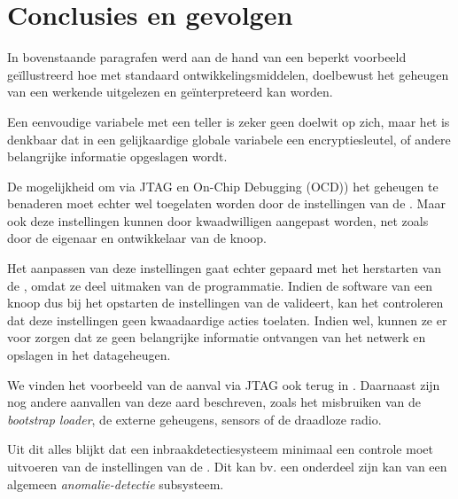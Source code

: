 \section{Conclusies en gevolgen}

In bovenstaande paragrafen werd aan de hand van een beperkt voorbeeld
ge\"illustreerd hoe met standaard ontwikkelingsmiddelen, doelbewust het
geheugen van een werkende \mcu uitgelezen en ge\"interpreteerd kan worden.

Een eenvoudige variabele met een teller is zeker geen doelwit op zich, maar het
is denkbaar dat in een gelijkaardige globale variabele een encryptiesleutel, of
andere belangrijke informatie opgeslagen wordt.

De mogelijkheid om via JTAG en On-Chip Debugging (OCD)) het geheugen te
benaderen moet echter wel toegelaten worden door de instellingen van de \mcu.
Maar ook deze instellingen kunnen door kwaadwilligen aangepast worden, net
zoals door de eigenaar en ontwikkelaar van de knoop.

Het aanpassen van deze instellingen gaat echter gepaard met het herstarten van
de \mcu, omdat ze deel uitmaken van de programmatie. Indien de software van een
knoop dus bij het opstarten de instellingen van de \mcu valideert, kan het
controleren dat deze instellingen geen kwaadaardige acties toelaten. Indien
wel, kunnen ze er voor zorgen dat ze geen belangrijke informatie ontvangen van
het netwerk en opslagen in het datageheugen.

We vinden het voorbeeld van de aanval via JTAG ook terug in
\citep{becher2006tampering}. Daarnaast zijn nog andere aanvallen van deze aard
beschreven, zoals het misbruiken van de \emph{bootstrap loader}, de externe
geheugens, sensors of de draadloze radio.

Uit dit alles blijkt dat een inbraakdetectiesysteem minimaal een controle moet
uitvoeren van de instellingen van de \mcu. Dit kan bv. een onderdeel zijn kan
van een algemeen \emph{anomalie-detectie} subsysteem.
